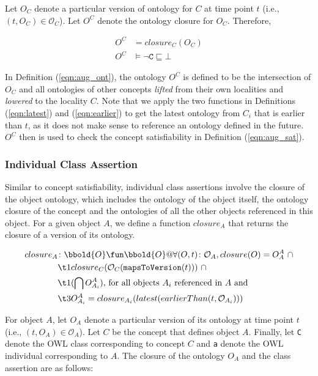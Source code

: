 \documentclass[preprint,12pt]{elsarticle}
\begin{document}
Let $O_C$ denote a particular version of ontology for $C$ at time point $t$ (i.e., $(t,O_C)\in\mathcal{O}_C$). Let $O^C$ denote the ontology closure for $O_C$. Therefore,

\begin{align}
O^C &= closure_C(O_C)\\
O^C &\models \lnot \mathtt{C} \sqsubseteq \bot\label{eqn:aug_sat}
\end{align}

In Definition (\ref{eqn:aug_ont}), the ontology $O^C$ is defined to be the intersection of $O_C$ and all ontologies of other concepts \emph{lifted} from their own localities and \emph{lowered} to the locality $C$. Note that we apply the two functions in Definitions (\ref{eqn:latest}) and (\ref{eqn:earlier}) to get the latest ontology from $C_i$ that is earlier than $t$, as it does not make sense to reference an ontology defined in the future. $O^C$ then is used to check the concept satisfiability in Definition (\ref{eqn:aug_sat}).

\subsubsection{Individual Class Assertion}
Similar to concept satisfiability, individual class assertions involve the closure of the object ontology, which includes the ontology of the object itself, the ontology closure of the concept and the ontologies of all the other objects referenced in this object. For a given object $A$, we define a function $closure_A$ that returns the closure of a version of its ontology.

\begin{align}
closure_A&\colon \bbold{O}\fun\bbold{O} @ \forall (O,t)\colon\mathcal{O}_A, closure(O) = O_A^A~ \cap\\
    &\t1 closure_C(\mathcal{O}_C(\mathtt{mapsToVersion}(t)))~ \cap\nonumber\\
    &\t1 (\bigcap O_{A_i}^A) \text{, for all objects $A_i$ referenced in $A$ and }\nonumber\\
    &\t3 O_{A_i}^A = closure_{A_i}(latest(earlierThan(t,\mathcal{O}_{A_i})))\nonumber
\end{align}

For object $A$, let $O_A$ denote a particular version of its ontology at time point $t$ (i.e., $(t,O_A)\in\mathcal{O}_A$). Let $C$ be the concept that defines object $A$. Finally, let \texttt{C} denote the OWL class corresponding to concept $C$ and \texttt{a} denote the OWL individual corresponding to $A$. The closure of the ontology $O_A$ and the class assertion are as follows:
\end{document}
